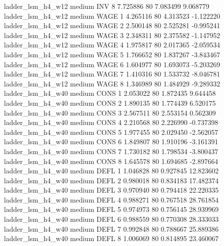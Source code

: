   ladder_lsm_h4_w12     medium      INV                 8  7.725886 80       7.083499           9.068779
  ladder_lsm_h4_w12     medium     WAGE                 1  4.265116 80       4.313523          -1.122220
  ladder_lsm_h4_w12     medium     WAGE                 2  2.500148 80       2.525281          -0.995241
  ladder_lsm_h4_w12     medium     WAGE                 3  2.348311 80       2.375582          -1.147952
  ladder_lsm_h4_w12     medium     WAGE                 4  1.975817 80       2.017365          -2.059534
  ladder_lsm_h4_w12     medium     WAGE                 5  1.766652 80       1.837267          -3.843467
  ladder_lsm_h4_w12     medium     WAGE                 6  1.604977 80       1.693073          -5.203269
  ladder_lsm_h4_w12     medium     WAGE                 7  1.410316 80       1.533732          -8.046781
  ladder_lsm_h4_w12     medium     WAGE                 8  1.346989 80       1.484929          -9.289332
  ladder_lsm_h4_w40     medium     CONS                 1  2.053022 80       1.872435           9.644458
  ladder_lsm_h4_w40     medium     CONS                 2  1.890135 80       1.774439           6.520175
  ladder_lsm_h4_w40     medium     CONS                 3  2.567511 80       2.553154           0.562309
  ladder_lsm_h4_w40     medium     CONS                 4  2.210568 80       2.226990          -0.737398
  ladder_lsm_h4_w40     medium     CONS                 5  1.977455 80       2.029450          -2.562057
  ladder_lsm_h4_w40     medium     CONS                 6  1.849807 80       1.910196          -3.161391
  ladder_lsm_h4_w40     medium     CONS                 7  1.730182 80       1.798534          -3.800437
  ladder_lsm_h4_w40     medium     CONS                 8  1.645578 80       1.694685          -2.897664
  ladder_lsm_h4_w40     medium     DEFL                 1  1.046828 80       0.927845          12.823602
  ladder_lsm_h4_w40     medium     DEFL                 2  0.980018 80       0.834183          17.482374
  ladder_lsm_h4_w40     medium     DEFL                 3  0.970940 80       0.794418          22.220335
  ladder_lsm_h4_w40     medium     DEFL                 4  0.988271 80       0.767518          28.761854
  ladder_lsm_h4_w40     medium     DEFL                 5  0.974973 80       0.756145          28.939969
  ladder_lsm_h4_w40     medium     DEFL                 6  0.988559 80       0.770308          28.333033
  ladder_lsm_h4_w40     medium     DEFL                 7  0.992848 80       0.788667          25.889386
  ladder_lsm_h4_w40     medium     DEFL                 8  1.006069 80       0.814895          23.460067

